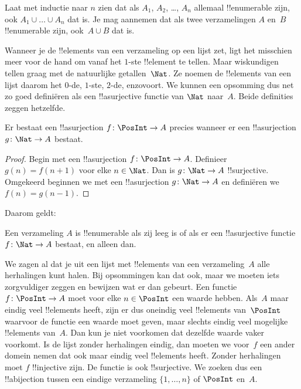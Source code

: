 \documentclass[openany]{memoir}
\begin{document}
\begin{prob}
  Laat met inductie naar $n$ zien dat als $A_1$, $A_2$, \dots, $A_n$
  allemaal !!{enumerable} zijn, ook $A_1 \cup \dots \cup A_n$ dat is.
  Je mag aannemen dat als twee verzamelingen $A$ en~$B$ !!{enumerable}
  zijn, ook~$A \cup B$ dat is. 
\end{prob}

Wanneer je de !!{element}s van een verzameling op een lijst zet, ligt
het misschien meer voor de hand om vanaf het $1$-ste !!{element} te
tellen. Maar wiskundigen tellen graag met de natuurlijke getallen~$\Nat$.
Ze noemen de !!{element}s van een lijst daarom het $0$-de, $1$-ste,
$2$-de, enzovoort. We kunnen een opsomming dus net
zo goed definiëren als een !!a{surjective} functie van $\Nat$ naar~$A$.
Beide definities zeggen hetzelfde.

\begin{prop}
  Er bestaat een !!a{surjection} $f\colon \PosInt \to A$ precies
  wanneer er een !!a{surjection} $g\colon \Nat \to A$ bestaat.
\end{prop}

\begin{proof}
  Begin met een !!a{surjection} $f\colon \PosInt \to A$. Definieer
  $g(n) = f(n+1)$ voor elke $n \in \Nat$. Dan is $g\colon \Nat \to A$
  !!{surjective}. Omgekeerd beginnen we met een !!a{surjection}
  $g\colon \Nat \to A$ en definiëren we $f(n) = g(n-1)$.
\end{proof}

Daarom geldt:

\begin{cor}
Een verzameling $A$ is !!{enumerable} als zij leeg is of als er een
!!a{surjective} functie $f\colon \Nat \to A$ bestaat, en alleen dan.
\end{cor}

We zagen al dat je uit een lijst met !!{element}s van een
verzameling~$A$ alle herhalingen kunt halen. Bij opsommingen kan dat
ook, maar we moeten iets zorgvuldiger zeggen en bewijzen wat er dan
gebeurt. Een functie $f\colon \PosInt \to A$ moet voor elke
$n \in \PosInt$ een waarde hebben. Als~$A$ maar eindig veel
!!{element}s heeft, zijn er dus oneindig veel !!{element}s van~$\PosInt$
waarvoor de functie een waarde moet geven, maar slechts eindig veel
mogelijke !!{element}s van~$A$. Dan kun je niet voorkomen dat dezelfde
waarde vaker voorkomt. Is de lijst zonder herhalingen eindig, dan
moeten we voor~$f$ een ander domein nemen dat ook maar eindig veel
!!{element}s heeft. Zonder herhalingen moet $f$ !!{injective} zijn.
De functie is ook !!{surjective}. We zoeken dus een !!a{bijection}
tussen een eindige verzameling $\{1, \dots, n\}$ of $\PosInt$ en~$A$.
\end{document}
